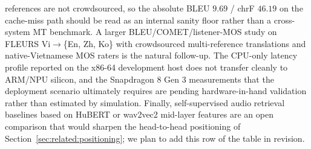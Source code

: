 \documentclass[a4paper,fleqn]{cas-dc}
\begin{document}
references are not crowdsourced, so the absolute BLEU $9.69$ / chrF $46.19$ on the cache-miss path should be read as an internal sanity floor rather than a cross-system MT benchmark. A larger BLEU/COMET/listener-MOS study on FLEURS Vi$\rightarrow$\{En, Zh, Ko\} with crowdsourced multi-reference translations and native-Vietnamese MOS raters is the natural follow-up. The CPU-only latency profile reported on the x86-64 development host does not transfer cleanly to ARM/NPU silicon, and the Snapdragon 8 Gen 3 measurements that the deployment scenario ultimately requires are pending hardware-in-hand validation rather than estimated by simulation. Finally, self-supervised audio retrieval baselines based on HuBERT or wav2vec2 mid-layer features are an open comparison that would sharpen the head-to-head positioning of Section~\ref{sec:related:positioning}; we plan to add this row of the table in revision.
\end{document}

